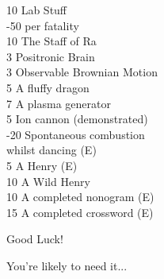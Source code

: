 \begin{multicols}{2}
\begin{tabbing}
10	\> Lab Stuff \\
-50	\> per fatality \\
10	\> The Staff of Ra \\
3	\> Positronic Brain \\
3	\> Observable Brownian Motion \\
5	\> A fluffy dragon \\
7	\> A plasma generator \\
5	\> Ion cannon (demonstrated) \\
-20	\> Spontaneous combustion \\ \> whilst dancing (E)\\
5	\> A Henry (E)\\
10	\> A Wild Henry\\
10	\> A completed nonogram (E)\\
15	\> A completed crossword  (E)\\
	\end{tabbing}
\end{multicols}

{\large Good Luck!}

You're likely to need it...
